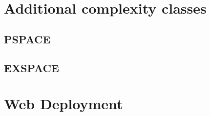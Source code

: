 \documentclass[11pt, a4paper, oneside]{report} %
\begin{document}
\section{Additional complexity classes}

\subsection{PSPACE}

\subsection{EXSPACE}

\section{Web Deployment}




\end{document}
